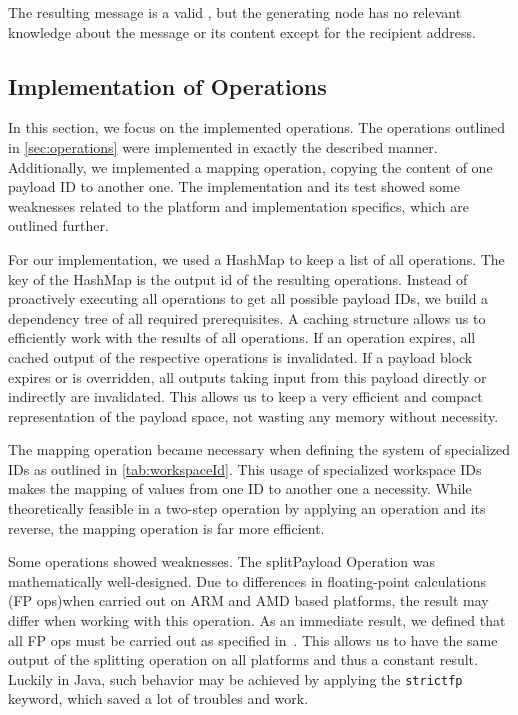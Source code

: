 The resulting message is a valid \VortexMessage, but the generating node has no relevant knowledge about the message or its content except for the recipient address.

\subsection{Implementation of Operations\label{sec:implOperations}}
In this section, we focus on the implemented operations. The operations outlined in \cref{sec:operations} were implemented in exactly the described manner. Additionally, we implemented a mapping operation, copying the content of one payload ID to another one. The implementation and its test showed some weaknesses related to the platform and implementation specifics, which are outlined further.

For our implementation, we used a HashMap to keep a list of all operations. The key of the HashMap is the output id of the resulting operations. Instead of proactively executing all operations to get all possible payload IDs, we build a dependency tree of all required prerequisites. A caching structure allows us to efficiently work with the results of all operations. If an operation expires, all cached output of the respective operations is invalidated. If a payload block expires or is overridden, all outputs taking input from this payload directly or indirectly are invalidated. This allows us to keep a very efficient and compact representation of the payload space, not wasting any memory without necessity.

The mapping operation became necessary when defining the system of specialized IDs as outlined in \cref{tab:workspaceId}. This usage of specialized workspace IDs makes the mapping of values from one  ID to another one a necessity. While theoretically feasible in a two-step operation by applying an operation and its reverse, the mapping operation is far more efficient.

Some operations showed weaknesses. The splitPayload Operation was mathematically well-designed. Due to differences in floating-point calculations (FP ops)when carried out on ARM and AMD based platforms, the result may differ when working with this operation. As an immediate result, we defined that all FP ops must be carried out as specified in~\cite{IEEE754}. This allows us to have the same output of the splitting operation on all platforms and thus a constant result. Luckily in Java, such behavior may be achieved by applying the \lstinline[columns=fixed,basicstyle={\normalsize}]{strictfp} keyword, which saved a lot of troubles and work.

